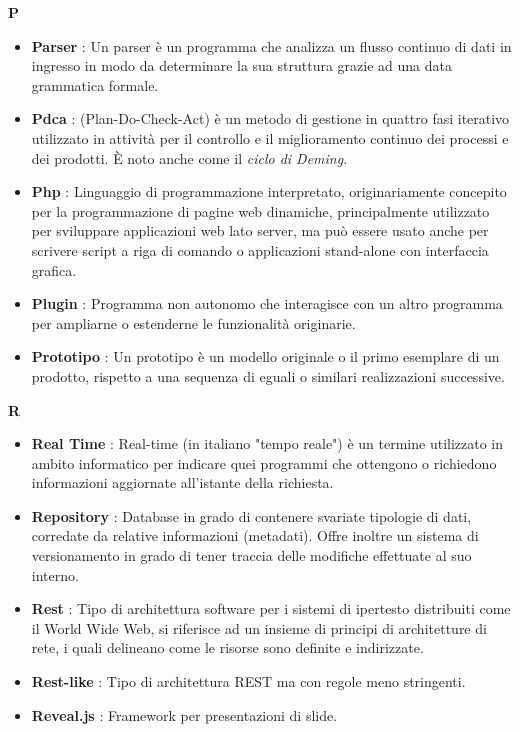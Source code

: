 \newpage
{\huge \textbf{P}}
\begin{flushleft}
\begin{itemize}[label={}]
\item \textbf{Parser} : Un parser è un programma che analizza un flusso continuo di dati in ingresso in modo da determinare la sua struttura grazie ad una data grammatica formale.
\item \textbf{Pdca} : (Plan-Do-Check-Act) è un metodo di gestione in quattro fasi iterativo utilizzato in attività per il controllo e il miglioramento continuo dei processi e dei prodotti. È noto anche come il \textit{ciclo di Deming}.
\item \textbf{Php} : Linguaggio di programmazione interpretato, originariamente concepito per la programmazione di pagine web dinamiche, principalmente utilizzato per sviluppare applicazioni web lato server, ma può essere usato anche per scrivere script a riga di comando o applicazioni stand-alone con interfaccia grafica.
\item \textbf{Plugin} : Programma non autonomo che interagisce con un altro programma per ampliarne o estenderne le funzionalità originarie.
\item \textbf{Prototipo} : Un prototipo è un modello originale o il primo esemplare di un prodotto, rispetto a una sequenza di eguali o similari realizzazioni successive.
\end{itemize}
\end{flushleft}
\newpage
{\huge \textbf{R}}
\begin{flushleft}
\begin{itemize}[label={}]
\item \textbf{Real Time} : Real-time (in italiano "tempo reale") è un termine utilizzato in ambito informatico per indicare quei programmi che ottengono o richiedono informazioni aggiornate all'istante della richiesta.
\item \textbf{Repository} : Database in grado di contenere svariate tipologie di dati, corredate da relative informazioni (metadati). Offre inoltre un sistema di versionamento in grado di tener traccia delle modifiche effettuate al suo interno.
\item \textbf{Rest} : Tipo di architettura software per i sistemi di ipertesto distribuiti come il World Wide Web, si riferisce ad un insieme di principi di architetture di rete, i quali delineano come le risorse sono definite e indirizzate.
\item \textbf{Rest-like} : Tipo di architettura REST ma con regole meno stringenti.
\item \textbf{Reveal.js} : Framework per presentazioni di slide.
\end{itemize}
\end{flushleft}
